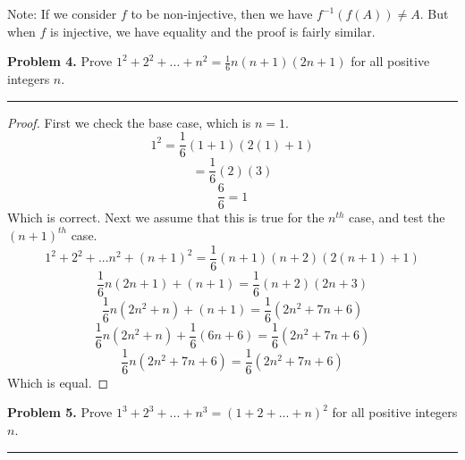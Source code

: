 \documentclass[leqno]{article}
\theoremstyle{nonumberplain}
\newtheorem{proof}{Proof}
\begin{document}
Note: If we consider $f$ to be non-injective, then we have $f^{-1}(f(A))\neq A$. But when $f$ is injective, we have equality and the proof is fairly similar.

\pagebreak




\noindent\textbf{Problem 4.} Prove $1^2 + 2^2 + ... + n^2 = \frac{1}{6} n (n+1)(2n+1)$ for all positive integers $n$.

\noindent\rule[0.5ex]{\linewidth}{1pt}

\begin{proof}
First we check the base case, which is $n=1$.
\[
1^2 = \frac{1}{6}(1+1)(2(1)+1)
\]
\[
=\frac{1}{6}(2)(3)
\]
\[
\frac{6}{6}=1
\]
Which is correct. Next we assume that this is true for the $n^{th}$ case, and test the $(n+1)^{th}$ case.
\[
1^2 + 2^2 + ... n^2 + (n+1)^2 = \frac{1}{6}(n+1)(n+2)(2(n+1)+1)
\]
\[
\frac{1}{6}n(2n+1)+(n+1)=\frac{1}{6}(n+2)(2n+3)
\]
\[
\frac{1}{6}n(2n^2+n)+(n+1)=\frac{1}{6}(2n^2+7n+6)
\]
\[
\frac{1}{6}n(2n^2+n)+\frac{1}{6}(6n+6)=\frac{1}{6}(2n^2+7n+6)
\]
\[
\frac{1}{6}n(2n^2+7n+6)=\frac{1}{6}(2n^2+7n+6)
\]
Which is equal. 
\end{proof}
\pagebreak




\noindent\textbf{Problem 5.} Prove $1^3 + 2^3 +... +n^3 = (1+2+...+n)^2$ for all positive integers $n$.

\noindent\rule[0.5ex]{\linewidth}{1pt}
\end{document}
